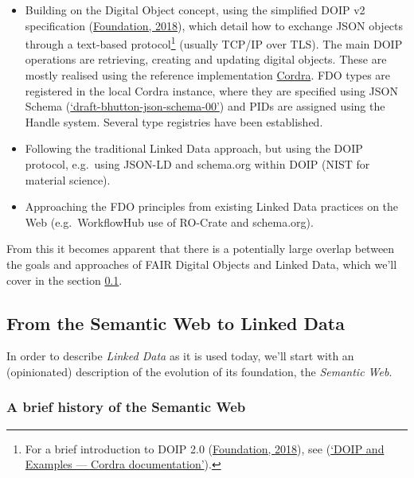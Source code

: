 \begin{itemize}
\tightlist
\item
  Building on the Digital Object concept, using the simplified DOIP v2 specification (\protect\hyperlink{ref-13TcbsZF6}{Foundation, 2018}), which detail how to exchange JSON objects through a text-based protocol\footnote{For a brief introduction to DOIP 2.0 (\protect\hyperlink{ref-13TcbsZF6}{Foundation, 2018}), see (\protect\hyperlink{ref-xuQKRRx5}{{`DOIP and Examples --- Cordra documentation'}}).} (usually TCP/IP over TLS). The main DOIP operations are retrieving, creating and updating digital objects. These are mostly realised using the reference implementation \href{https://cordra.org/}{Cordra}. FDO types are registered in the local Cordra instance, where they are specified using JSON Schema (\protect\hyperlink{ref-15EZ2D0Rm}{{`draft-bhutton-json-schema-00'}}) and PIDs are assigned using the Handle system. Several type registries have been established.
\item
  Following the traditional Linked Data approach, but using the DOIP protocol, e.g.~using JSON-LD and schema.org within DOIP (NIST for material science).
\item
  Approaching the FDO principles from existing Linked Data practices on the Web (e.g.~WorkflowHub use of RO-Crate and schema.org).
\end{itemize}

From this it becomes apparent that there is a potentially large overlap between the goals and approaches of FAIR Digital Objects and Linked Data, which we'll cover in the section \ref{sec:ld}.

\hypertarget{sec:ld}{%
\subsection{From the Semantic Web to Linked Data}\label{sec:ld}}

In order to describe \emph{Linked Data} as it is used today, we'll start with an (opinionated) description of the evolution of its foundation, the \emph{Semantic Web}.

\hypertarget{sec:semweb}{%
\subsubsection{A brief history of the Semantic Web}\label{sec:semweb}}

